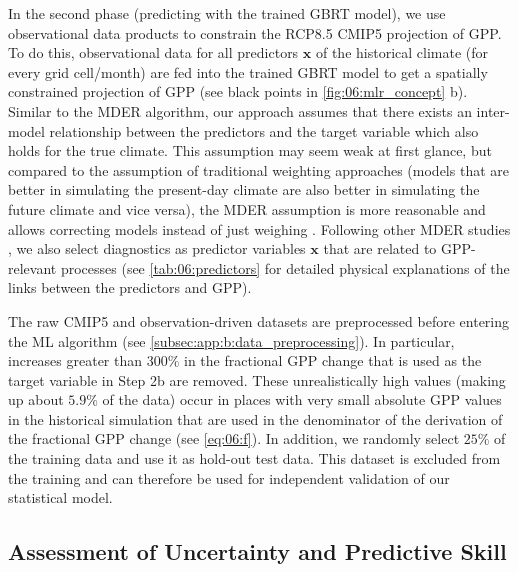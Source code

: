 In the second phase (predicting with the trained \ac{GBRT} model), we use
observational data products to constrain the \acs{RCP}8.5 \acs{CMIP}5
projection of \ac{GPP}. To do this, observational data for all predictors
$\bm{x}$ of the historical climate (for every grid cell/month) are fed into the
trained \ac{GBRT} model to get a spatially constrained projection of \ac{GPP}
(see black points in \cref{fig:06:mlr_concept}{\color{BrownRed} b}). Similar to
the \ac{MDER} algorithm, our approach assumes that there exists an inter-model
relationship between the predictors and the target variable which also holds
for the true climate. This assumption may seem weak at first glance, but
compared to the assumption of traditional weighting approaches (models that are
better in simulating the present-day climate are also better in simulating the
future climate and vice versa), the \ac{MDER} assumption is more reasonable and
allows correcting models instead of just weighing
. Following other
\ac{MDER} studies \autocite{Karpechko2013, Senftleben2020, Wenzel2016a}, we
also select diagnostics as predictor variables $\bm{x}$ that are related to
\acs{GPP}-relevant processes (see \cref{tab:06:predictors} for detailed
physical explanations of the links between the predictors and \ac{GPP}).

The raw \acs{CMIP}5 and observation-driven datasets are preprocessed before
entering the \ac{ML} algorithm (see \cref{subsec:app:b:data_preprocessing}). In
particular, increases greater than $300 \unit{\%}$ in the fractional \ac{GPP}
change that is used as the target variable in Step 2b are removed. These
unrealistically high values (making up about $5.9 \unit{\%}$ of the data) occur
in places with very small absolute \ac{GPP} values in the historical simulation
that are used in the denominator of the derivation of the fractional \ac{GPP}
change (see \cref{eq:06:f}). In addition, we randomly select $25 \unit{\%}$ of
the training data and use it as hold-out test data. This dataset is excluded
from the training and can therefore be used for independent validation of our
statistical model.


\subsection{Assessment of Uncertainty and Predictive Skill}
\label{subsec:06:uncertainty_and_skill}

